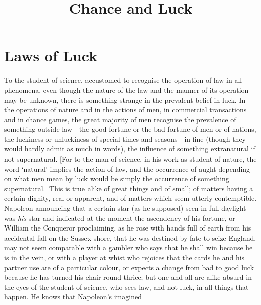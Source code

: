\documentclass[letterpaper,12pt,oneside,openany]{memoir}
\begin{document}
\setpnumwidth{2.75em}
\setcounter{secnumdepth}{-1}
\setcounter{tocdepth}{1}
\tableofcontents*
\clearpage


\pagestyle{headings}
\title{Chance and Luck}
\thispagestyle{chapter}
\chapter{Laws of Luck}

To the student of science, accustomed to recognise the
operation of law in all phenomena, even though the
nature of the law and the manner of its operation may
be unknown, there is something strange in the prevalent
belief in luck. In the operations of nature and in the
actions of men, in commercial transactions and in
chance games, the great majority of men recognise the
prevalence of something outside law---the good fortune
or the bad fortune of men or of nations, the luckiness
or unluckiness of special times and seasons---in fine
(though they would hardly admit as much in words),
the influence of something extranatural if not supernatural.
[For to the man of science, in his work as
student of nature, the word `natural' implies the action
of law, and the occurrence of aught depending on what
men mean by luck would be simply the occurrence of
something supernatural.] This is true alike of great
things and of small; of matters having a certain dignity,
real or apparent, and of matters which seem utterly contemptible.
Napoleon announcing that a certain star
(as he supposed) seen in full daylight was \textit{his} star and
indicated at the moment the ascendency of his fortune,
or William the Conqueror proclaiming, as he rose with
hands full of earth from his accidental fall on the Sussex
shore, that he was destined by fate to seize England,
may not seem comparable with a gambler who says that
he shall win because he is in the vein, or with a player
at whist who rejoices that the cards he and his partner
use are of a particular colour, or expects a change from
bad to good luck because he has turned his chair round
thrice; but one and all are alike absurd in the eyes of
the student of science, who sees law, and not luck, in all
things that happen. He knows that Napoleon's imagined
\end{document}
